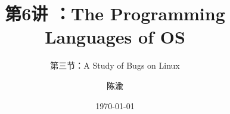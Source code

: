 


\title[第6讲]{第6讲 ：The Programming Languages of OS} %
\subtitle{第三节：A Study of Bugs on Linux }
\author{陈渝} %
\date{\today} %




\begin{frame}
\titlepage %
\end{frame}

%
%

